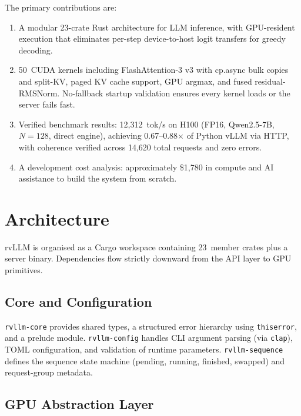\documentclass[11pt,a4paper]{article}
\begin{document}
The primary contributions are:
\begin{enumerate}
  \item A modular 23-crate Rust architecture for LLM inference, with GPU-resident
        execution that eliminates per-step device-to-host logit transfers for greedy
        decoding.
  \item 50~CUDA kernels including FlashAttention-3 v3 with cp.async bulk copies and split-KV,
        paged KV cache support, GPU argmax, and fused residual-RMSNorm. No-fallback
        startup validation ensures every kernel loads or the server fails fast.
  \item Verified benchmark results: 12{,}312~tok/s on H100 (FP16, Qwen2.5-7B, $N\!=\!128$, direct engine),
        achieving 0.67--0.88$\times$ of Python vLLM via HTTP, with coherence verified across 14{,}620 total
        requests and zero errors.
  \item A development cost analysis: approximately \$1{,}780 in compute and AI
        assistance to build the system from scratch.
\end{enumerate}

\section{Architecture}
\label{sec:architecture}

rvLLM is organised as a Cargo workspace containing 23~member crates plus a server
binary. Dependencies flow strictly downward from the API layer to GPU primitives.

\subsection{Core and Configuration}

\texttt{rvllm-core} provides shared types, a structured error hierarchy using
\texttt{thiserror}, and a prelude module. \texttt{rvllm-config} handles CLI argument
parsing (via \texttt{clap}), TOML configuration, and validation of runtime
parameters. \texttt{rvllm-sequence} defines the sequence state machine
(pending, running, finished, swapped) and request-group metadata.

\subsection{GPU Abstraction Layer}
\end{document}
